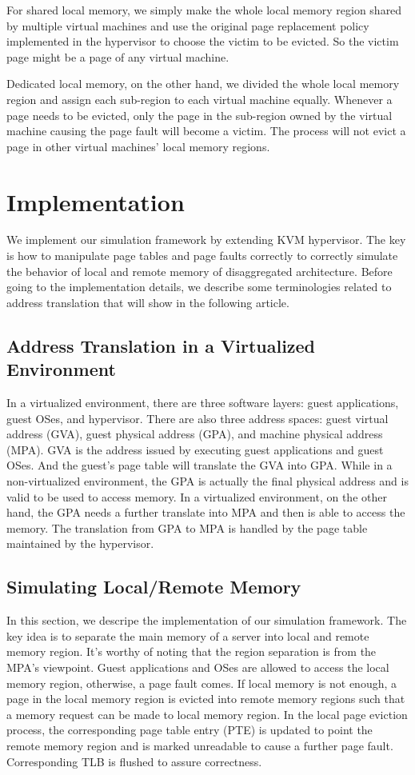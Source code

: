 \documentclass[twocolumn]{article}
\begin{document}
For shared local memory, we simply make the whole local memory region shared by multiple virtual machines and use the original page replacement policy implemented in the hypervisor to choose the victim to be evicted. So the victim page might be a page of any virtual machine.

Dedicated local memory, on the other hand, we divided the whole local memory region and assign each sub-region to each virtual machine equally. Whenever a page needs to be evicted, only the page in the sub-region owned by the virtual machine causing the page fault will become a victim. The process will not evict a page in other virtual machines' local memory regions.

\section{Implementation}
We implement our simulation framework by extending KVM hypervisor. The key is how to manipulate page tables and page faults correctly to correctly simulate the behavior of local and remote memory of disaggregated architecture. Before going to the implementation details, we describe some terminologies related to address translation that will show in the following article.

\subsection{Address Translation in a Virtualized Environment}
In a virtualized environment, there are three software layers: guest applications, guest OSes, and hypervisor. There are also three address spaces: guest virtual address (GVA), guest physical address (GPA), and machine physical address (MPA). GVA is the address issued by executing guest applications and guest OSes. And the guest's page table will translate the GVA into GPA. While in a non-virtualized environment, the GPA is actually the final physical address and is valid to be used to access memory. In a virtualized environment, on the other hand, the GPA needs a further translate into MPA and then is able to access the memory. The translation from GPA to MPA is handled by the page table maintained by the hypervisor.

\subsection{Simulating Local/Remote Memory}
In this section, we descripe the implementation of our simulation framework. The key idea is to separate the main memory of a server into local and remote memory region. It's worthy of noting that the region separation is from the MPA's viewpoint. Guest applications and OSes are allowed to access the local memory region, otherwise, a page fault comes. If local memory is not enough, a page in the local memory region is evicted into remote memory regions such that a memory request can be made to local memory region. In the local page eviction process, the corresponding page table entry (PTE) is updated to point the remote memory region and is marked unreadable to cause a further page fault. Corresponding TLB is flushed to assure correctness.
\end{document}
